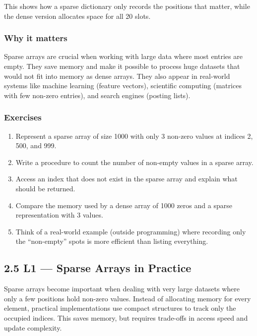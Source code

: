 \documentclass[
  letterpaper,
  DIV=11,
  numbers=noendperiod]{scrreprt}
\providecommand{\tightlist}{%
  \setlength{\itemsep}{0pt}\setlength{\parskip}{0pt}}
\begin{document}
This shows how a sparse dictionary only records the positions that
matter, while the dense version allocates space for all 20 slots.

\subsubsection{Why it matters}\label{why-it-matters-24}

Sparse arrays are crucial when working with large data where most
entries are empty. They save memory and make it possible to process huge
datasets that would not fit into memory as dense arrays. They also
appear in real-world systems like machine learning (feature vectors),
scientific computing (matrices with few non-zero entries), and search
engines (posting lists).

\subsubsection{Exercises}\label{exercises-24}

\begin{enumerate}
\def\labelenumi{\arabic{enumi}.}
\tightlist
\item
  Represent a sparse array of size 1000 with only 3 non-zero values at
  indices 2, 500, and 999.
\item
  Write a procedure to count the number of non-empty values in a sparse
  array.
\item
  Access an index that does not exist in the sparse array and explain
  what should be returned.
\item
  Compare the memory used by a dense array of 1000 zeros and a sparse
  representation with 3 values.
\item
  Think of a real-world example (outside programming) where recording
  only the ``non-empty'' spots is more efficient than listing
  everything.
\end{enumerate}

\subsection{2.5 L1 --- Sparse Arrays in
Practice}\label{l1-sparse-arrays-in-practice}

Sparse arrays become important when dealing with very large datasets
where only a few positions hold non-zero values. Instead of allocating
memory for every element, practical implementations use compact
structures to track only the occupied indices. This saves memory, but
requires trade-offs in access speed and update complexity.
\end{document}

